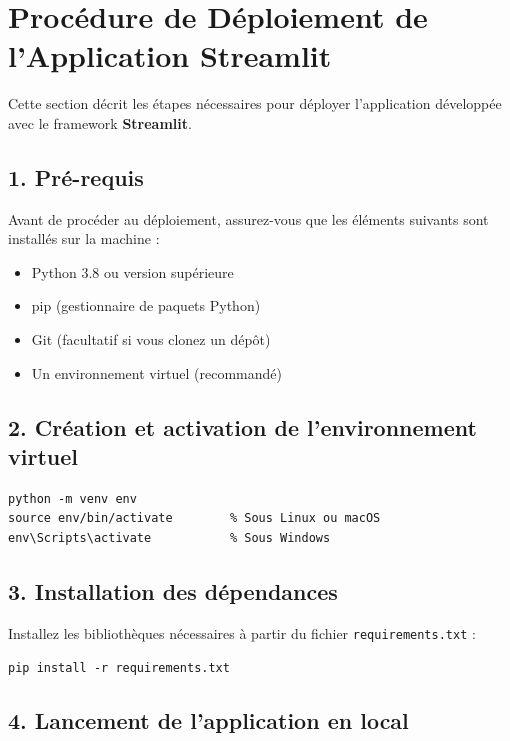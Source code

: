 \newpage
 \section{Procédure de Déploiement de l'Application Streamlit}

Cette section décrit les étapes nécessaires pour déployer l'application développée avec le framework \textbf{Streamlit}.

\subsection{1. Pré-requis}

Avant de procéder au déploiement, assurez-vous que les éléments suivants sont installés sur la machine :

\begin{itemize}
  \item Python 3.8 ou version supérieure
  \item pip (gestionnaire de paquets Python)
  \item Git (facultatif si vous clonez un dépôt)
  \item Un environnement virtuel (recommandé)
\end{itemize}

\subsection{2. Création et activation de l'environnement virtuel}

\begin{verbatim}
python -m venv env
source env/bin/activate        % Sous Linux ou macOS
env\Scripts\activate           % Sous Windows
\end{verbatim}

\subsection{3. Installation des dépendances}

Installez les bibliothèques nécessaires à partir du fichier \texttt{requirements.txt} :

\begin{verbatim}
pip install -r requirements.txt
\end{verbatim}

\subsection{4. Lancement de l'application en local}

